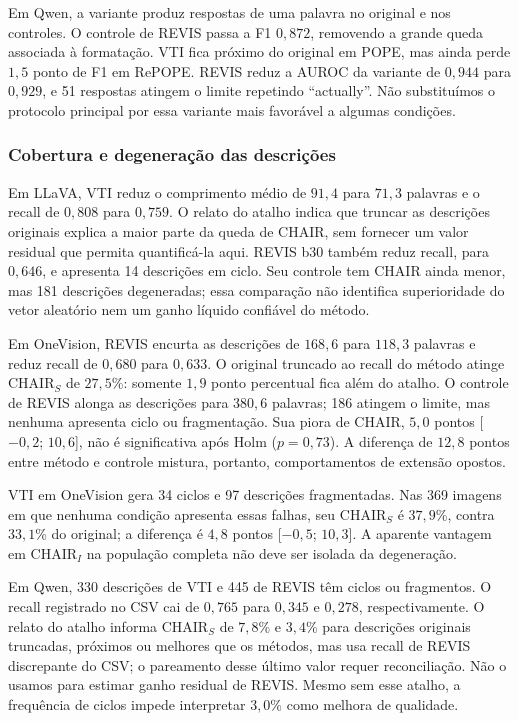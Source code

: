 Em Qwen, a variante produz respostas de uma palavra no original e nos controles. O controle de REVIS passa a F1 $0{,}872$, removendo a grande queda associada à formatação. VTI fica próximo do original em POPE, mas ainda perde $1{,}5$ ponto de F1 em RePOPE. REVIS reduz a AUROC da variante de $0{,}944$ para $0{,}929$, e 51 respostas atingem o limite repetindo ``actually''. Não substituímos o protocolo principal por essa variante mais favorável a algumas condições.

\subsubsection{Cobertura e degeneração das descrições}
Em LLaVA, VTI reduz o comprimento médio de $91{,}4$ para $71{,}3$ palavras e o recall de $0{,}808$ para $0{,}759$. O relato do atalho indica que truncar as descrições originais explica a maior parte da queda de CHAIR, sem fornecer um valor residual que permita quantificá-la aqui. REVIS b30 também reduz recall, para $0{,}646$, e apresenta 14 descrições em ciclo. Seu controle tem CHAIR ainda menor, mas 181 descrições degeneradas; essa comparação não identifica superioridade do vetor aleatório nem um ganho líquido confiável do método.

Em OneVision, REVIS encurta as descrições de $168{,}6$ para $118{,}3$ palavras e reduz recall de $0{,}680$ para $0{,}633$. O original truncado ao recall do método atinge CHAIR$_S$ de $27{,}5$\%: somente $1{,}9$ ponto percentual fica além do atalho. O controle de REVIS alonga as descrições para $380{,}6$ palavras; 186 atingem o limite, mas nenhuma apresenta ciclo ou fragmentação. Sua piora de CHAIR, $5{,}0$ pontos [$-0{,}2$; $10{,}6$], não é significativa após Holm ($p=0{,}73$). A diferença de $12{,}8$ pontos entre método e controle mistura, portanto, comportamentos de extensão opostos.

VTI em OneVision gera 34 ciclos e 97 descrições fragmentadas. Nas 369 imagens em que nenhuma condição apresenta essas falhas, seu CHAIR$_S$ é $37{,}9$\%, contra $33{,}1$\% do original; a diferença é $4{,}8$ pontos [$-0{,}5$; $10{,}3$]. A aparente vantagem em CHAIR$_I$ na população completa não deve ser isolada da degeneração.

Em Qwen, 330 descrições de VTI e 445 de REVIS têm ciclos ou fragmentos. O recall registrado no CSV cai de $0{,}765$ para $0{,}345$ e $0{,}278$, respectivamente. O relato do atalho informa CHAIR$_S$ de $7{,}8$\% e $3{,}4$\% para descrições originais truncadas, próximos ou melhores que os métodos, mas usa recall de REVIS discrepante do CSV; o pareamento desse último valor requer reconciliação. Não o usamos para estimar ganho residual de REVIS. Mesmo sem esse atalho, a frequência de ciclos impede interpretar $3{,}0$\% como melhora de qualidade.

